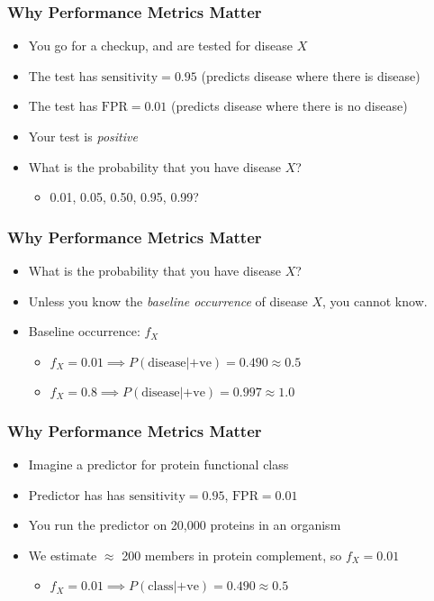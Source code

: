 \begin{frame}
  \frametitle{Why Performance Metrics Matter}
  \begin{itemize}
    \item<1-> You go for a checkup, and are tested for disease $X$
    \item<1-> The test has $\text{sensitivity}=0.95$ (predicts disease where there is disease)
    \item<1-> The test has $\text{FPR}=0.01$ (predicts disease where there is no disease)
    \item<2-> Your test is \emph{positive}
    \item<2-> What is the probability that you have disease $X$?
    \begin{itemize}
      \item 0.01, 0.05, 0.50, 0.95, 0.99?
    \end{itemize}
  \end{itemize} 
\end{frame}

\begin{frame}
  \frametitle{Why Performance Metrics Matter}
  \begin{itemize}
    \item<1-> What is the probability that you have disease $X$?
    \item<1-> Unless you know the \emph{baseline occurrence} of disease $X$, you cannot know.
    \item<2-> Baseline occurrence: $f_X$
    \begin{itemize}
      \item $f_X = 0.01 \implies P(\text{disease}|\text{+ve}) = 0.490 \approx 0.5$
      \item $f_X = 0.8 \implies P(\text{disease}|\text{+ve}) = 0.997 \approx 1.0$         
    \end{itemize}
  \end{itemize} 
\end{frame}

\begin{frame}
  \frametitle{Why Performance Metrics Matter}
  \begin{itemize}
    \item<1-> Imagine a predictor for protein functional class
    \item<1-> Predictor has has $\text{sensitivity}=0.95$, $\text{FPR}=0.01$
    \item<1-> You run the predictor on 20,000 proteins in an organism
    \item<2-> We estimate $\approx$ 200 members in protein complement, so $f_X=0.01$
    \begin{itemize}
      \item $f_X = 0.01 \implies P(\text{class}|\text{+ve}) = 0.490 \approx 0.5$
    \end{itemize}
  \end{itemize} 
\end{frame}

